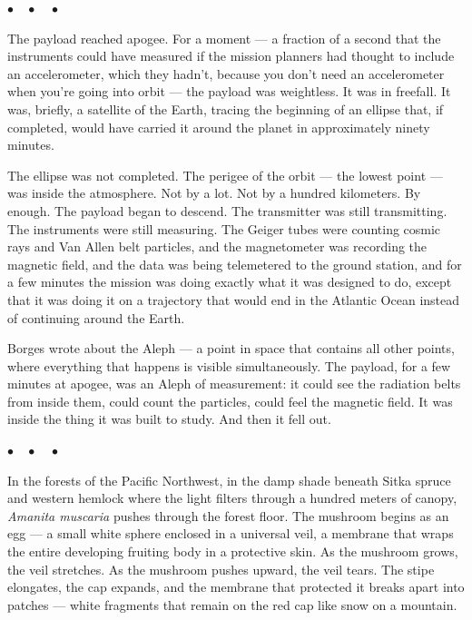 \documentclass[12pt, letterpaper]{article}
\begin{document}
\begin{center}
$\bullet\quad\bullet\quad\bullet$
\end{center}

The payload reached apogee. For a moment --- a fraction of a second that the instruments could have measured if the mission planners had thought to include an accelerometer, which they hadn't, because you don't need an accelerometer when you're going into orbit --- the payload was weightless. It was in freefall. It was, briefly, a satellite of the Earth, tracing the beginning of an ellipse that, if completed, would have carried it around the planet in approximately ninety minutes.

The ellipse was not completed. The perigee of the orbit --- the lowest point --- was inside the atmosphere. Not by a lot. Not by a hundred kilometers. By enough. The payload began to descend. The transmitter was still transmitting. The instruments were still measuring. The Geiger tubes were counting cosmic rays and Van Allen belt particles, and the magnetometer was recording the magnetic field, and the data was being telemetered to the ground station, and for a few minutes the mission was doing exactly what it was designed to do, except that it was doing it on a trajectory that would end in the Atlantic Ocean instead of continuing around the Earth.

Borges wrote about the Aleph --- a point in space that contains all other points, where everything that happens is visible simultaneously. The payload, for a few minutes at apogee, was an Aleph of measurement: it could see the radiation belts from inside them, could count the particles, could feel the magnetic field. It was inside the thing it was built to study. And then it fell out.

\begin{center}
$\bullet\quad\bullet\quad\bullet$
\end{center}

In the forests of the Pacific Northwest, in the damp shade beneath Sitka spruce and western hemlock where the light filters through a hundred meters of canopy, \textit{Amanita muscaria} pushes through the forest floor. The mushroom begins as an egg --- a small white sphere enclosed in a universal veil, a membrane that wraps the entire developing fruiting body in a protective skin. As the mushroom grows, the veil stretches. As the mushroom pushes upward, the veil tears. The stipe elongates, the cap expands, and the membrane that protected it breaks apart into patches --- white fragments that remain on the red cap like snow on a mountain.
\end{document}
